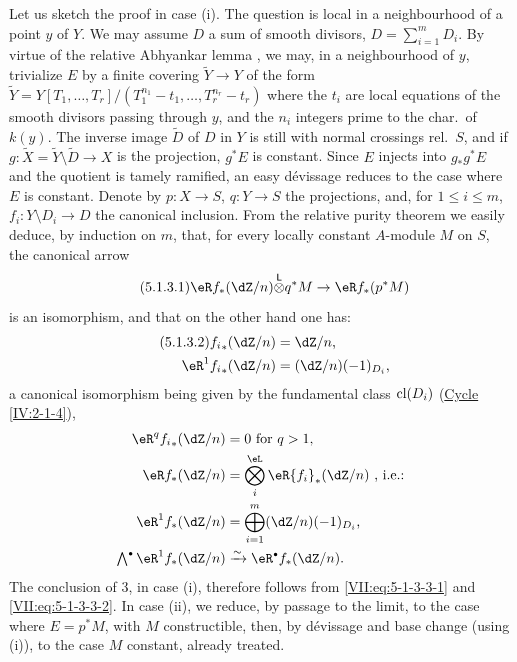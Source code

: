 Let us sketch the proof in case (i). The question is local in a
neighbourhood of a point $y$ of $Y$. We may assume $D$ a sum of smooth
divisors, $D=\sum_{i=1}^m D_i$. By virtue of the relative Abhyankar lemma
\cite[XIII 5.5]{sga1}, we may, in a neighbourhood of $y$, trivialize $E$ by a
finite covering $\widetilde Y\to Y$ of the form
$\widetilde Y=Y[T_1,\dots,T_r]/(T_1^{n_1}-t_1,\dots,T_r^{n_r}-t_r)$ where the
$t_i$ are local equations of the smooth divisors passing through $y$, and the
$n_i$ integers prime to the char.\ of $k(y)$. The inverse image
$\widetilde D$ of $D$ in $Y$ is still with normal crossings rel.\ $S$,
and if $g:\widetilde X=\widetilde Y\setminus \widetilde D\to X$ is the
projection, $g^\ast E$ is constant. Since $E$ injects into $g_\ast g^\ast E$
and the quotient is tamely ramified, an easy d\'evissage reduces
to the case where $E$ is constant. Denote by $p:X\to S$, $q:Y\to S$ the
projections, and, for $1\leqslant i\leqslant m$, $f_i:Y\setminus D_i \to D$
the canonical inclusion. From the relative purity theorem \cite[XVI 3.7]{sga4}
we easily deduce, by induction on $m$, that, for every locally constant
$A$-module $M$ on $S$, the canonical arrow
\begin{equation*}\tag{5.1.3.1}\label{VII:eq:5-1-3-3-1} %
  \eR f_\ast (\dZ/n)\lotimes q^\ast M\to \eR f_\ast (p^\ast M)
\end{equation*}
is an isomorphism, and that on the other hand one has:
\begin{align*}\tag{5.1.3.2}\label{VII:eq:5-1-3-3-2}
  {f_i}_\ast(\dZ/n) &= \dZ/n \text{,} \\
  \eR^1 {f_i}_\ast (\dZ/n) &= (\dZ/n)(-1)_{D_i} \text{,}
\end{align*}
a canonical isomorphism being given by the fundamental class $\operatorname{cl}(D_i)$
(\hyperref[IV]{Cycle} \ref{IV:2-1-4}),
\begin{align*}
  \eR^q {f_i}_\ast(\dZ/n) &= 0\text{ for $q>1$,} \\
  \eR f_\ast (\dZ/n) &= \bigotimes_i^\eL \eR {f_i}_\ast (\dZ/n) \text{ , i.e.:} \\
  \eR^1 f_\ast(\dZ/n) &= \bigoplus_{i=1}^m (\dZ/n)(-1)_{D_i} \text{,} \\
  \textstyle\bigwedge^\bullet \eR^1 f_\ast(\dZ/n) &\iso \eR^\bullet f_\ast (\dZ/n) \text{.}
\end{align*}
The conclusion of 3, in case (i), therefore follows from
\eqref{VII:eq:5-1-3-3-1} and \eqref{VII:eq:5-1-3-3-2}. In case (ii), we reduce,
by passage to the limit, to the case where $E=p^\ast M$, with $M$
constructible, then, by d\'evissage and base change (using (i)), to the
case $M$ constant, already treated.

